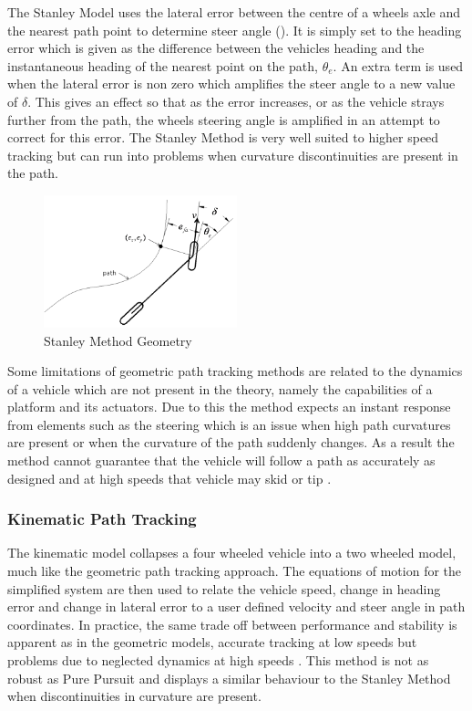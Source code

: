 \documentclass[main.tex]{subfiles}
\begin{document}
The Stanley Model uses the lateral error between the centre of a wheels axle and the nearest path point  to determine steer angle (). It is simply set to the heading error which is given as the difference between the vehicles heading and the instantaneous heading of the nearest point on the path, $\theta_e$. An extra term is used when the lateral error is non zero which amplifies the steer angle to a new value of $\delta$.  This gives an effect so that as the error increases, or as the vehicle strays further from the path, the wheels steering angle is amplified in an attempt to correct for this error. The Stanley Method is very well suited to higher speed tracking but can run into problems when curvature discontinuities are present in the path.
\begin{figure}[ht]
\includegraphics[width=0.5\textwidth]{3-LiteratureReview/stanleyMethod.png}
\centering
\caption[Stanley Method Geometry]{Stanley Method Geometry \parencite{snider2009}} 
\end{figure}

Some limitations of geometric path tracking methods are related to the dynamics of a vehicle which are not present in the theory, namely the capabilities of a platform and its actuators. Due to this the method expects an instant response from elements such as the steering which is an issue when high path curvatures are present or when the curvature of the path suddenly changes. As a result the method cannot guarantee that the vehicle will follow a path as accurately as designed and at high speeds that vehicle may skid or tip \parencite{coulter1992}.

\subsubsection{Kinematic Path Tracking}
The kinematic model collapses a four wheeled vehicle into a two wheeled model, much like the geometric path tracking approach. The equations of motion for the simplified system are then used to relate the vehicle speed, change in heading error and change in lateral error to a user defined velocity and steer angle in path coordinates. In practice, the same trade off between performance and stability is apparent as in the geometric models, accurate tracking at low speeds but problems due to neglected dynamics at high speeds \parencite{snider2009}. This method is not as robust as Pure Pursuit and displays a similar behaviour to the Stanley Method when discontinuities in curvature are present.
\end{document}
